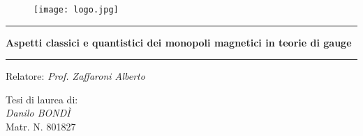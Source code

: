 \begin{titlepage}


\vspace{0.5cm}

\begin{figure}[h]
\centering
\texttt{[image: logo.jpg]}
\end{figure}

\vspace{2cm}
\hrule
\vspace{0.5cm}

\centering\huge\textbf{
   Aspetti classici e quantistici dei monopoli magnetici in teorie di gauge}

\vspace{0.5cm}
\hrule
\vspace{2cm}

\large
\raggedright Relatore: \emph{Prof. Zaffaroni Alberto} \par
\begin{table}[h]
\large
	Tesi di laurea di: \\
	\emph{Danilo BONDÌ} \\
	Matr. N. 801827\\
\end{table}

\vspace{1cm}
\large
\vfill{}

\end{titlepage}



 		\setcounter{page}{2}
         \null
         \thispagestyle{empty}
         \newpage

\tableofcontents

\newpage
